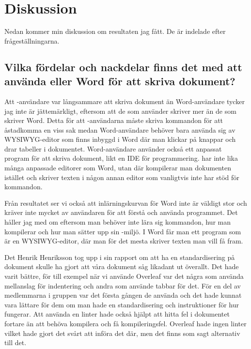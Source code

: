 \section{Diskussion}
\label{sec:discussion-tuhkala}
Nedan kommer min diskussion om resultaten jag fått. De är indelade efter frågeställningarna.

\subsection{Vilka fördelar och nackdelar finns det med att använda \latex eller Word för att skriva dokument?}
Att \latex-användare var långsammare att skriva dokument än Word-användare tycker jag inte är jättemärkligt, eftersom att de som använder \latex skriver mer än de som skriver Word. Detta för att \latex-användarna måste skriva kommandon för att åstadkomma en viss sak medan Word-användare behöver bara använda sig av WYSIWYG-editor som finns inbyggd i Word där man klickar på knappar och drar tabeller i dokumentet. Word-användare använder också ett anpassat program för att skriva dokument, likt en IDE för programmering. \latex har inte lika många anpassade editorer som Word, utan där kompilerar man dokumenten istället och skriver texten i någon annan editor som vanligtvis inte har stöd för \latex kommandon.

Från resultatet ser vi också att inlärningskurvan för Word inte är väldigt stor och kräver inte mycket av användaren för att förstå och använda programmet. Det håller jag med om eftersom man behöver inte lära sig kommandon, hur man kompilerar och hur man sätter upp sin \latex-miljö. I Word får man ett program som är en WYSIWYG-editor, där man för det mesta skriver texten man vill få fram.

Det Henrik Henriksson tog upp i sin rapport om att ha en standardisering på \latex dokument skulle ha gjort att våra dokument såg likadant ut överallt. Det hade varit bättre, för till exempel när vi använde Overleaf var det några som använda mellanslag för indentering och andra som använde tabbar för det. För en del av medlemmarna i gruppen var det första gången de använda \latex och det hade kunnat vara lättare för dem om man hade en standardisering och instruktioner för hur \latex fungerar. Att använda en linter hade också hjälpt att hitta fel i dokumentet fortare än att behöva kompilera och få kompileringsfel. Overleaf hade ingen linter vilket hade gjort det svårt att införa det där, men det finns som sagt alternativ till det.

